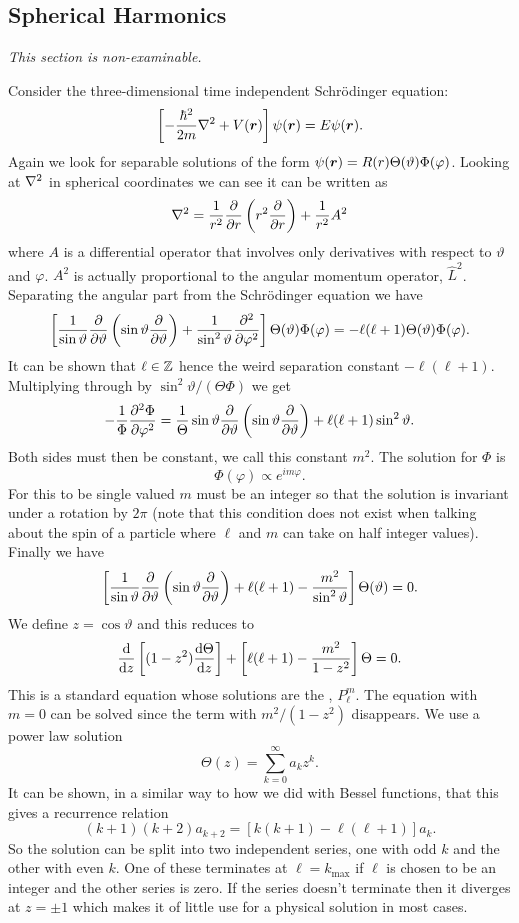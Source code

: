 \documentclass[a4paper]{article}
\begin{document}
    \subsection{Spherical Harmonics}
    \textit{This section is non-examinable.}
    
    Consider the three-dimensional time independent Schr\"odinger equation:
    \[\left[-\frac{\hbar^2}{2m}\nabla^2 + V(\bm{r})\right]\psi(\bm{r}) = E\psi(\bm{r}).\]
    Again we look for separable solutions of the form \(\psi(\bm{r}) = R(r)\Theta(\vartheta)\Phi(\varphi)\).
    Looking at \(\nabla^2\) in spherical coordinates we can see it can be written as
    \[\nabla^2 = \frac{1}{r^2}\pdv{r}\left(r^2\pdv{r}\right) + \frac{1}{r^2}A^2\]
    where \(A\) is a differential operator that involves only derivatives with respect to \(\vartheta\) and \(\varphi\).
    \(A^2\)  is actually proportional to the angular momentum operator, \(\hat{L}^2\).
    Separating the angular part from the Schr\"odinger equation we have
    \[\left[\frac{1}{\sin\vartheta}\pdv{\vartheta} \left(\sin\vartheta\pdv{\vartheta}\right) + \frac{1}{\sin^2\vartheta}\pdv[2]{\varphi}\right] \Theta(\vartheta)\Phi(\varphi) = -\ell(\ell + 1)\Theta(\vartheta)\Phi(\varphi).\]
    It can be shown that \(\ell\in\mathbb{Z}\) hence the weird separation constant \(-\ell(\ell + 1)\).
    Multiplying through by \(\sin^2\vartheta / (\Theta\Phi)\) we get
    \[-\frac{1}{\Phi}\pdv[2]{\Phi}{\varphi} = \frac{1}{\Theta}\sin\vartheta\pdv{\vartheta}\left(\sin\vartheta\pdv{\vartheta}\right) + \ell(\ell + 1)\sin^2\vartheta.\]
    Both sides must then be constant, we call this constant \(m^2\).
    The solution for \(\Phi\) is
    \[\Phi(\varphi) \propto e^{im\varphi}.\]
    For this to be single valued \(m\) must be an integer so that the solution is invariant under a rotation by \(2\pi\) (note that this condition does not exist when talking about the spin of a particle where \(\ell\) and \(m\) can take on half integer values).
    Finally we have
    \[\left[\frac{1}{\sin\vartheta}\pdv{\vartheta} \left(\sin\vartheta\pdv{\vartheta}\right) + \ell(\ell+ 1) - \frac{m^2}{\sin^2\vartheta}\right]\Theta(\vartheta) = 0.\]
    We define \(z = \cos\vartheta\) and this reduces to
    \[\dv{z}\left[(1 - z^2)\dv{\Theta}{z}\right] + \left[\ell(\ell+ 1) - \frac{m^2}{1 - z^2}\right]\Theta = 0.\]
    This is a standard equation whose solutions are the , \(P_\ell^m\).
    The equation with \(m = 0\) can be solved since the term with \(m^2/(1 - z^2)\) disappears.
    We use a power law solution
    \[\Theta(z) = \sum_{k=0}^{\infty} a_kz^k.\]
    It can be shown, in a similar way to how we did with Bessel functions, that this gives a recurrence relation
    \[(k + 1)(k + 2)a_{k + 2} = [k(k + 1) - \ell(\ell + 1)]a_k.\]
    So the solution can be split into two independent series, one with odd \(k\) and the other with even \(k\).
    One of these terminates at \(\ell = k_{\max}\) if \(\ell\) is chosen to be an integer and the other series is zero.
    If the series doesn't terminate then it diverges at \(z = \pm 1\) which makes it of little use for a physical solution in most cases.
    
\end{document}
